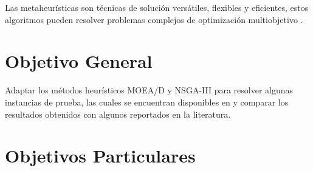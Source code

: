 \documentclass[letterpaper,10pt]{article}
\begin{document}
% 
Las metaheurísticas son técnicas de solución versátiles, flexibles y eficientes, estos algoritmos pueden resolver problemas complejos de optimización multiobjetivo \cite{coello1999comprehensive} .
\newline
% 
%  	

\section{Objetivo General}

Adaptar los métodos heurísticos MOEA/D y NSGA-III para resolver algunas instancias de prueba, las cuales se encuentran disponibles en \cite{zhang2008multiobjective} y comparar los resultados obtenidos con algunos reportados en la literatura.

\section{Objetivos Particulares}
\end{document}
